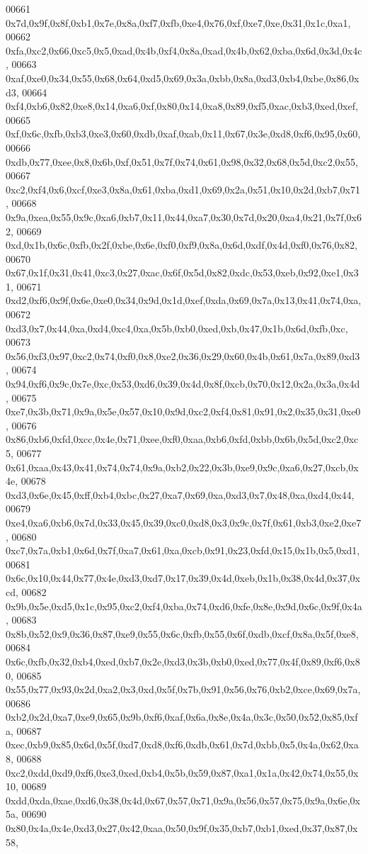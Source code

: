 \begin{DoxyCode}
00661   0x7d,0x9f,0x8f,0xb1,0x7e,0x8a,0xf7,0xfb,0xe4,0x76,0xf,0xe7,0xe,0x31,0x1c,0xa1,
00662   0xfa,0xc2,0x66,0xc5,0x5,0xad,0x4b,0xf4,0x8a,0xad,0x4b,0x62,0xba,0x6d,0x3d,0x4c,
00663   0xaf,0xe0,0x34,0x55,0x68,0x64,0xd5,0x69,0x3a,0xbb,0x8a,0xd3,0xb4,0xbe,0x86,0xd3,
00664   0xf4,0xb6,0x82,0xe8,0x14,0xa6,0xf,0x80,0x14,0xa8,0x89,0xf5,0xac,0xb3,0xed,0xef,
00665   0xf,0x6c,0xfb,0xb3,0xe3,0x60,0xdb,0xaf,0xab,0x11,0x67,0x3e,0xd8,0xf6,0x95,0x60,
00666   0xdb,0x77,0xee,0x8,0x6b,0xf,0x51,0x7f,0x74,0x61,0x98,0x32,0x68,0x5d,0xc2,0x55,
00667   0xc2,0xf4,0x6,0xcf,0xe3,0x8a,0x61,0xba,0xd1,0x69,0x2a,0x51,0x10,0x2d,0xb7,0x71,
00668   0x9a,0xea,0x55,0x9c,0xa6,0xb7,0x11,0x44,0xa7,0x30,0x7d,0x20,0xa4,0x21,0x7f,0x62,
00669   0xd,0x1b,0x6c,0xfb,0x2f,0xbe,0x6e,0xf0,0xf9,0x8a,0x6d,0xdf,0x4d,0xf0,0x76,0x82,
00670   0x67,0x1f,0x31,0x41,0xc3,0x27,0xac,0x6f,0x5d,0x82,0xdc,0x53,0xeb,0x92,0xe1,0x31,
00671   0xd2,0xf6,0x9f,0x6e,0xe0,0x34,0x9d,0x1d,0xef,0xda,0x69,0x7a,0x13,0x41,0x74,0xa,
00672   0xd3,0x7,0x44,0xa,0xd4,0xc4,0xa,0x5b,0xb0,0xed,0xb,0x47,0x1b,0x6d,0xfb,0xc,
00673   0x56,0xf3,0x97,0xc2,0x74,0xf0,0x8,0xe2,0x36,0x29,0x60,0x4b,0x61,0x7a,0x89,0xd3,
00674   0x94,0xf6,0x9c,0x7e,0xc,0x53,0xd6,0x39,0x4d,0x8f,0xcb,0x70,0x12,0x2a,0x3a,0x4d,
00675   0xe7,0x3b,0x71,0x9a,0x5e,0x57,0x10,0x9d,0xc2,0xf4,0x81,0x91,0x2,0x35,0x31,0xe0,
00676   0x86,0xb6,0xfd,0xcc,0x4e,0x71,0xee,0xf0,0xaa,0xb6,0xfd,0xbb,0x6b,0x5d,0xc2,0xc5,
00677   0x61,0xaa,0x43,0x41,0x74,0x74,0x9a,0xb2,0x22,0x3b,0xe9,0x9c,0xa6,0x27,0xcb,0x4e,
00678   0xd3,0x6e,0x45,0xff,0xb4,0xbc,0x27,0xa7,0x69,0xa,0xd3,0x7,0x48,0xa,0xd4,0x44,
00679   0xe4,0xa6,0xb6,0x7d,0x33,0x45,0x39,0xc0,0xd8,0x3,0x9c,0x7f,0x61,0xb3,0xe2,0xe7,
00680   0xc7,0x7a,0xb1,0x6d,0x7f,0xa7,0x61,0xa,0xcb,0x91,0x23,0xfd,0x15,0x1b,0x5,0xd1,
00681   0x6c,0x10,0x44,0x77,0x4e,0xd3,0xd7,0x17,0x39,0x4d,0xeb,0x1b,0x38,0x4d,0x37,0xcd,
00682   0x9b,0x5e,0xd5,0x1c,0x95,0xc2,0xf4,0xba,0x74,0xd6,0xfe,0x8e,0x9d,0x6c,0x9f,0x4a,
00683   0x8b,0x52,0x9,0x36,0x87,0xe9,0x55,0x6c,0xfb,0x55,0x6f,0xdb,0xcf,0x8a,0x5f,0xe8,
00684   0x6c,0xfb,0x32,0xb4,0xed,0xb7,0x2e,0xd3,0x3b,0xb0,0xed,0x77,0x4f,0x89,0xf6,0x80,
00685   0x55,0x77,0x93,0x2d,0xa2,0x3,0xd,0x5f,0x7b,0x91,0x56,0x76,0xb2,0xce,0x69,0x7a,
00686   0xb2,0x2d,0xa7,0xe9,0x65,0x9b,0xf6,0xaf,0x6a,0x8e,0x4a,0x3c,0x50,0x52,0x85,0xfa,
00687   0xec,0xb9,0x85,0x6d,0x5f,0xd7,0xd8,0xf6,0xdb,0x61,0x7d,0xbb,0x5,0x4a,0x62,0xa8,
00688   0xc2,0xdd,0xd9,0xf6,0xe3,0xed,0xb4,0x5b,0x59,0x87,0xa1,0x1a,0x42,0x74,0x55,0x10,
00689   0xdd,0xda,0xae,0xd6,0x38,0x4d,0x67,0x57,0x71,0x9a,0x56,0x57,0x75,0x9a,0x6e,0x5a,
00690   0x80,0x4a,0x4e,0xd3,0x27,0x42,0xaa,0x50,0x9f,0x35,0xb7,0xb1,0xed,0x37,0x87,0x58,

\end{DoxyCode}
